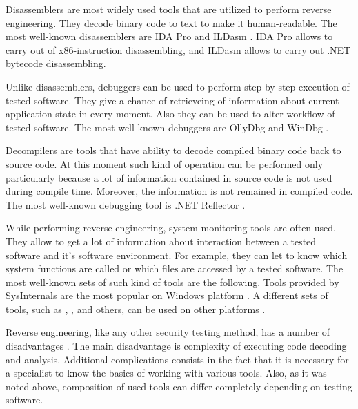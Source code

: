 %
Disassemblers are most widely used tools that are utilized to perform reverse engineering. 
%
They decode binary code to text to make it human-readable. 
%
The most well-known disassemblers are IDA Pro  and ILDasm . 
%
IDA Pro allows to carry out of x86-instruction disassembling, and ILDasm allows to carry out .NET  bytecode disassembling. 

%
Unlike disassemblers, debuggers can be used to perform step-by-step execution of tested software. 
%
They give a chance of retrieveing of information about current application state in every moment. 
%
Also they can be used to alter workflow of tested software. 
%
The most well-known debuggers are OllyDbg  and WinDbg . 

%
Decompilers are tools that have ability to decode compiled binary code back to source code. 
%
At this moment such kind of operation can be performed only particularly because a lot of information contained in source code is not used during compile time. 
%
Moreover, the information is not remained in compiled code. 
%
The most well-known debugging tool is .NET Reflector . 

%
While performing reverse engineering, system monitoring tools are often used. 
%
They allow to get a lot of information about interaction between a tested software and it's software environment. 
%
For example, they can let to know which system functions are called or which files are accessed by a tested software. 
%
The most well-known sets of such kind of tools are the following. 
%
Tools provided by SysInternals  are the most popular on Windows platform . 
%
A different sets of tools, such as , , and others, can be used on other platforms . 

%
Reverse engineering, like any other security testing method, has a number of disadvantages . 
%
The main disadvantage is complexity of executing code decoding and analysis. 
%
Additional complications consists in the fact that it is necessary for a specialist to know the basics of working with various tools. 
%
Also, as it was noted above, composition of used tools can differ completely depending on testing software. 


